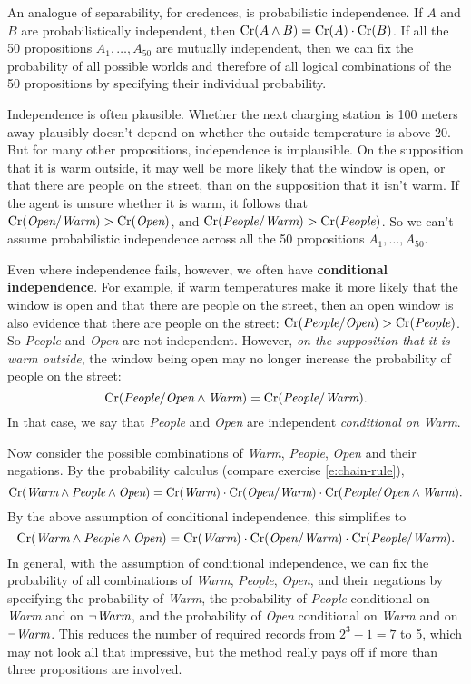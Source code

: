 An analogue of separability, for credences, is probabilistic
independence. If $A$ and $B$ are probabilistically independent, then
$\text{Cr}(A\land B) = \text{Cr}(A) \cdot \text{Cr}(B)$. If all the 50 propositions
$A_1,\ldots,A_{50}$ are mutually independent, then we can fix the
probability of all possible worlds and therefore of all logical
combinations of the 50 propositions by specifying their individual
probability.

Independence is often plausible. Whether the next charging station is
100 meters away plausibly doesn't depend on whether the outside
temperature is above 20\celsius. But for many other propositions,
independence is implausible. On the supposition that it is warm
outside, it may well be more likely that the window is open, or that
there are people on the street, than on the supposition that it isn't
warm. If the agent is unsure whether it is warm, it follows that
$\text{Cr}(\emph{Open}/\emph{Warm}) > \text{Cr}(\emph{Open})$, and
$\text{Cr}(\emph{People}/\emph{Warm}) > \text{Cr}(\emph{People})$. So we can't
assume probabilistic independence across all the 50 propositions
$A_1,\ldots,A_{50}$.

Even where independence fails, however, we often have
\textbf{conditional independence}. For example, if warm temperatures
make it more likely that the window is open and that there are people
on the street, then an open window is also evidence that there are
people on the street: $\text{Cr}(\emph{People}/\emph{Open}) >
\text{Cr}(\emph{People})$.  So \emph{People} and \emph{Open} are not
independent. However, \emph{on the supposition that it is warm
  outside}, the window being open may no longer increase the
probability of people on the street:
\[
\text{Cr}(\emph{People}/\emph{Open} \land \emph{Warm}) = \text{Cr}(\emph{People}/
\emph{Warm}).
\]
In that case, we say that \emph{People} and \emph{Open} are
independent \emph{conditional on} \emph{Warm}.

Now consider the possible combinations of \emph{Warm}, \emph{People},
\emph{Open} and their negations. By the probability calculus (compare
exercise \ref{e:chain-rule}),
\[
\text{Cr}(\emph{Warm} \land \emph{People} \land \emph{Open}) = 
\text{Cr}(\emph{Warm}) \cdot \text{Cr}(\emph{Open}/\emph{Warm}) \cdot \text{Cr}(\emph{People}/\emph{Open} \land \emph{Warm}).
\]
By the above assumption of conditional independence, this simplifies to
\[
\text{Cr}(\emph{Warm} \land \emph{People} \land \emph{Open}) = 
\text{Cr}(\emph{Warm}) \cdot \text{Cr}(\emph{Open}/\emph{Warm}) \cdot \text{Cr}(\emph{People}/\emph{Warm}).
\]
In general, with the assumption of conditional independence, we can
fix the probability of all combinations of \emph{Warm}, \emph{People},
\emph{Open}, and their negations by specifying the probability of
\emph{Warm}, the probability of \emph{People} conditional on
\emph{Warm} and on $\neg\emph{Warm}$, and the probability of \emph{Open}
conditional on \emph{Warm} and on $\neg\emph{Warm}$.  This reduces the
number of required records from $2^3-1 = 7$ to 5, which may not look
all that impressive, but the method really pays off if more than three
propositions are involved.

